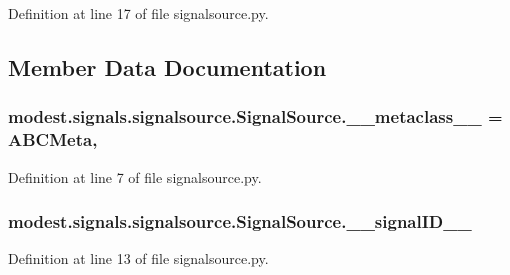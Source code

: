 Definition at line 17 of file signalsource.\+py.



\subsection{Member Data Documentation}
\subsubsection[{\texorpdfstring{\+\_\+\+\_\+metaclass\+\_\+\+\_\+}{__metaclass__}}]{\setlength{\rightskip}{0pt plus 5cm}modest.\+signals.\+signalsource.\+Signal\+Source.\+\_\+\+\_\+metaclass\+\_\+\+\_\+ = A\+B\+C\+Meta\hspace{0.3cm}{\ttfamily [static]}, {\ttfamily [private]}}\hypertarget{classmodest_1_1signals_1_1signalsource_1_1SignalSource_a07d7658d1b008499bcdf05c718638160}{}\label{classmodest_1_1signals_1_1signalsource_1_1SignalSource_a07d7658d1b008499bcdf05c718638160}


Definition at line 7 of file signalsource.\+py.

\subsubsection[{\texorpdfstring{\+\_\+\+\_\+signal\+I\+D\+\_\+\+\_\+}{__signalID__}}]{\setlength{\rightskip}{0pt plus 5cm}modest.\+signals.\+signalsource.\+Signal\+Source.\+\_\+\+\_\+signal\+I\+D\+\_\+\+\_\+\hspace{0.3cm}{\ttfamily [private]}}\hypertarget{classmodest_1_1signals_1_1signalsource_1_1SignalSource_a8b8d7f422fe4de0e2f0add245c05b3c1}{}\label{classmodest_1_1signals_1_1signalsource_1_1SignalSource_a8b8d7f422fe4de0e2f0add245c05b3c1}


Definition at line 13 of file signalsource.\+py.

